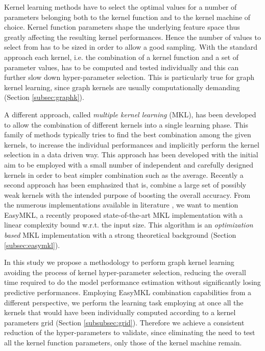 
Kernel learning methods have to select the optimal values for a number of parameters
belonging both to the kernel function and to the kernel machine of choice.
Kernel function parameters shape the underlying feature space thus greatly affecting
the resulting kernel performances. Hence the number of values to select from has
to be sized in order to allow a good sampling.
With the standard approach each kernel, i.e. the combination of a kernel function
and a set of parameter values, has to be computed and tested individually and this can
further slow down hyper-parameter selection.
This is particularly true for graph kernel learning, since graph kernels are usually
computationally demanding (Section \ref{subsec:graphk}).


A different approach, called \emph{multiple kernel learning} (MKL), has been
developed to allow the combination of different kernels into a single learning phase.
This family of methods typically tries to find the best combination among the
given kernels, to increase the individual performances and implicitly perform the
kernel selection in a data driven way.
This approach has been developed with the initial aim to be employed with a small
number of independent and carefully designed kernels in order to beat simpler combination
such as the average.
Recently a second approach has been emphasized that is, combine a large set of possibly
weak kernels with the intended purpose of boosting the overall accuracy.
From the numerous implementations available in literature \cite{journals/jmlr/GonenA11},
we want to mention EasyMKL, a recently proposed state-of-the-art MKL implementation
\cite{aiolli2015easymkl} with a linear complexity bound w.r.t. the input size.
This algorithm is an \emph{optimization based} MKL implementation with a strong
theoretical background (Section \ref{subsec:easymkl}).

In this study we propose a methodology to perform graph kernel learning avoiding
the process of kernel hyper-parameter selection, reducing the overall time
required to do the model performance estimation without significantly losing
predictive performances.
Employing EasyMKL combination capabilities from a different perspective, we
perform the learning task employing at once all the kernels that would have been
individually computed according to a kernel parameters grid (Section \ref{subsubsec:grid}).
Therefore we achieve a consistent reduction of the hyper-parameters to validate, since
eliminating the need to test all the kernel function parameters, only those of the
kernel machine remain.

